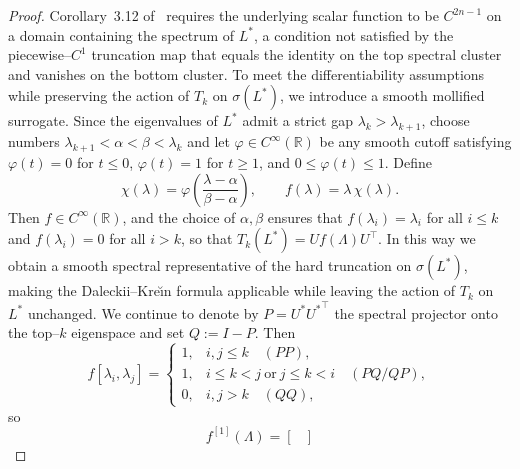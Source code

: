\documentclass[final,hidelinks,onefignum,onetabnum]{siamart250211}
\providecommand{\1}{\mathbf{1}}
\theoremstyle{plain}
\begin{document}
\begin{proof}
Corollary~3.12 of~\cite{higham2008functions} requires the underlying scalar function to be
$C^{2n-1}$ on a domain containing the spectrum of $L^*$, a condition not satisfied by the
piecewise--$C^1$ truncation map that equals the identity on the top spectral cluster and vanishes on
the bottom cluster.  To meet the differentiability assumptions while preserving the action of
$T_k$ on $\sigma(L^*)$, we introduce a smooth mollified surrogate.  Since the eigenvalues of $L^*$
admit a strict gap $\lambda_k>\lambda_{k+1}$, choose numbers $\lambda_{k+1}<\alpha<\beta<\lambda_k$
and let $\varphi\in C^\infty(\mathbb{R})$ be any smooth cutoff satisfying
$\varphi(t)=0$ for $t\le 0$, $\varphi(t)=1$ for $t\ge 1$, and $0\le \varphi(t)\le 1$.
Define
\[
\chi(\lambda)=\varphi\!\left(\frac{\lambda-\alpha}{\beta-\alpha}\right),
\qquad
f(\lambda)=\lambda\,\chi(\lambda).
\]
Then $f\in C^\infty(\mathbb{R})$, and the choice of $\alpha,\beta$ ensures that
$f(\lambda_i)=\lambda_i$ for all $i\le k$ and $f(\lambda_i)=0$ for all $i>k$, so that
$T_k(L^*)=U f(\Lambda) U^\top$.  In this way we obtain a smooth spectral representative of the
hard truncation on $\sigma(L^*)$, making the Daleckii--Kre\u{\i}n formula applicable while leaving
the action of $T_k$ on $L^*$ unchanged.  We continue to denote by $P=U^*{U^*}^\top$ the spectral
projector onto the top--$k$ eigenspace and set $Q:=I-P$. Then
\[
f[\lambda_i,\lambda_j]=
\begin{cases}
1,& i,j\le k\quad(PP),\\
1,& i\le k<j\ \text{or}\ j\le k<i\quad(PQ/QP),\\
0,& i,j>k\quad(QQ),
\end{cases}
\]
so
\[
f^{[1]}(\Lambda)=
\begin{bmatrix}

\end{bmatrix}\]
\end{proof}
\end{document}
